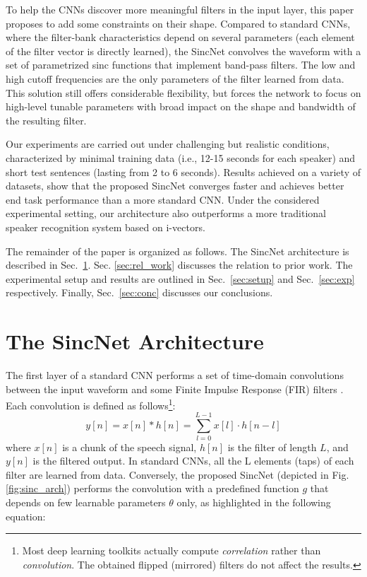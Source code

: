 \documentclass{article}
\begin{document}
To help the CNNs discover more meaningful filters in the input layer, this paper proposes to add some constraints on their shape. Compared to standard CNNs, where the filter-bank characteristics depend on several parameters (each element of the filter vector is directly learned), the SincNet convolves the waveform with a set of parametrized sinc functions that implement band-pass filters. The low and high cutoff frequencies are the only parameters of the filter learned from data. This solution still offers considerable flexibility, but forces the network to focus on high-level tunable parameters with broad impact on the shape and bandwidth of the resulting filter.

Our experiments are carried out under challenging but realistic conditions, characterized by minimal training data (i.e., 12-15 seconds for each speaker) and short test sentences (lasting from 2 to 6 seconds). Results achieved on a variety of datasets, show that the proposed SincNet converges faster and achieves better end task performance than a more standard CNN. Under the considered experimental setting, our architecture also outperforms a more traditional speaker recognition system based on i-vectors.

The remainder of the paper is organized as follows. The SincNet architecture is described in Sec.~\ref{sec:sinc}. Sec. \ref{sec:rel_work} discusses the relation to prior work. The experimental setup and results are outlined in Sec.~\ref{sec:setup} and Sec.~\ref{sec:exp} respectively. Finally, Sec.~\ref{sec:conc} discusses our conclusions.



\label{sec:intro}


\section{The SincNet Architecture}
\label{sec:sinc}
The first layer of a standard CNN performs a set of time-domain convolutions between the input waveform and some Finite Impulse Response (FIR) filters \cite{rabiner11}. Each convolution is defined as follows\footnote{Most deep learning toolkits actually compute \textit{correlation} rather than \textit{convolution}. The obtained flipped (mirrored) filters do not affect the results.}:
\begin{equation}
y[n]=x[n]*h[n] = \sum\limits_{l=0}^{L-1} x[l]\cdot h[n-l] 
\end{equation}
where $x[n]$ is a chunk of the speech signal, $h[n]$ is the filter of length $L$, and $y[n]$ is the filtered output. In standard CNNs, all the L elements (taps) of each filter are learned from data. Conversely, the proposed SincNet (depicted in Fig. \ref{fig:sinc_arch}) performs the convolution with a predefined function $g$ that depends on few learnable parameters $\theta$ only, as highlighted in the following equation:
\end{document}
